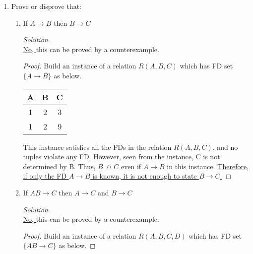 \documentclass[10pt]{article}
\begin{document}
\begin{enumerate}
\begin{enumerate}
    \end{enumerate}
    
    \item Prove or disprove that:
    \begin{enumerate}
        \item If $A \rightarrow B$ then $B \rightarrow C$
        
        \begin{mdframed}[leftmargin=-6.5mm]
        \textit{Solution}.\\
        \underline{No, } this can be proved by a counterexample.
        \begin{proof}
        Build an instance of a relation $R(A, B, C)$ which has FD set $\{A \rightarrow B\}$ as below.
        
        \begin{center}
        \begin{tabular}{| c | c | c |}
        \hline
        A & B & C\\
        \hline
        \hline
        1 & 2 & 3 \\
        \hline
        1 & 2 & 9 \\
        \hline
        \end{tabular}
        \end{center}
        
        This instance satisfies all the FDs in the relation $R(A, B, C)$, and no tuples violate any FD. However, seen from the instance, C is not determined by B. Thus, $B \nrightarrow C$ even if $A \rightarrow B$ in this instance. \underline{Therefore, if only the FD $A \rightarrow B$ is known, it is not enough to state $B \rightarrow C$.}
        
        \end{proof}
        \end{mdframed}
        
        \item If $AB \rightarrow C$ then $A \rightarrow C$ and $B \rightarrow C$
        
        \begin{mdframed}[leftmargin=-6.5mm]
        \textit{Solution}.\\
        \underline{No, } this can be proved by a counterexample.
        \begin{proof}
        Build an instance of a relation $R(A, B, C, D)$ which has FD set $\{AB \rightarrow C\}$ as below.
        

\end{proof}
\end{mdframed}
\end{enumerate}
\end{enumerate}
\end{document}
